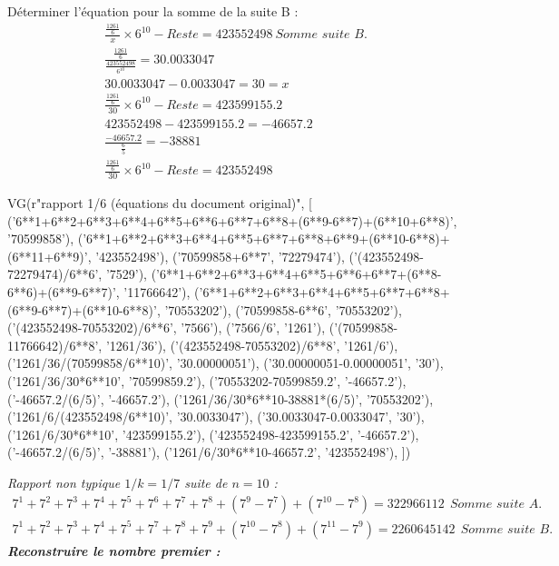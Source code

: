 \documentclass[11pt,a4paper]{article}
\begin{document}
Déterminer l’équation pour la somme de la suite B :
\begin{gather*}
\frac{\frac{1261}{6}}{x}\times6^{10}-\textit{Reste}=423552498\ \textit{Somme suite B.}\\
\frac{\frac{1261}{6}}{\frac{423552498}{6^{10}}}=30.0033047\\
30.0033047-0.0033047=30=x\\
\frac{\frac{1261}{6}}{30}\times6^{10}-\textit{Reste}=423599155.2\\
423552498-423599155.2=-46657.2\\
\frac{-46657.2}{\frac{6}{5}}=-38881\\
\frac{\frac{1261}{6}}{30}\times6^{10}-\textit{Reste}=423552498
\end{gather*}

\begin{pycode}
VG(r"rapport 1/6 (équations du document original)", [
  ('6**1+6**2+6**3+6**4+6**5+6**6+6**7+6**8+(6**9-6**7)+(6**10+6**8)', '70599858'),
  ('6**1+6**2+6**3+6**4+6**5+6**7+6**8+6**9+(6**10-6**8)+(6**11+6**9)', '423552498'),
  ('70599858+6**7', '72279474'),
  ('(423552498-72279474)/6**6', '7529'),
  ('6**1+6**2+6**3+6**4+6**5+6**6+6**7+(6**8-6**6)+(6**9-6**7)', '11766642'),
  ('6**1+6**2+6**3+6**4+6**5+6**7+6**8+(6**9-6**7)+(6**10-6**8)', '70553202'),
  ('70599858-6**6', '70553202'),
  ('(423552498-70553202)/6**6', '7566'),
  ('7566/6', '1261'),
  ('(70599858-11766642)/6**8', '1261/36'),
  ('(423552498-70553202)/6**8', '1261/6'),
  ('1261/36/(70599858/6**10)', '30.00000051'),
  ('30.00000051-0.00000051', '30'),
  ('1261/36/30*6**10', '70599859.2'),
  ('70553202-70599859.2', '-46657.2'),
  ('-46657.2/(6/5)', '-46657.2'),
  ('1261/36/30*6**10-38881*(6/5)', '70553202'),
  ('1261/6/(423552498/6**10)', '30.0033047'),
  ('30.0033047-0.0033047', '30'),
  ('1261/6/30*6**10', '423599155.2'),
  ('423552498-423599155.2', '-46657.2'),
  ('-46657.2/(6/5)', '-38881'),
  ('1261/6/30*6**10-46657.2', '423552498'),
])
\end{pycode}

\noindent\textit{Rapport non typique $1/k=1/7$ suite de $n=10$ :}
\begin{gather*}
7^{1}+7^{2}+7^{3}+7^{4}+7^{5}+7^{6}+7^{7}+7^{8}+(7^{9}-7^{7})+(7^{10}-7^{8})=322966112\ \ \textit{Somme suite A.}\\
7^{1}+7^{2}+7^{3}+7^{4}+7^{5}+7^{7}+7^{8}+7^{9}+(7^{10}-7^{8})+(7^{11}-7^{9})=2260645142\ \ \textit{Somme suite B.}
\end{gather*}
\noindent\textbf{\textit{Reconstruire le nombre premier :}}
\end{document}
